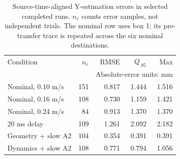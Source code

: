 \begin{table}[t]
\centering\small
\caption{Source-time-aligned Y-estimation errors in selected completed runs. $n_e$ counts error samples, not independent trials. The nominal row uses box 1; its pre-transfer trace is repeated across the six nominal destinations.}
\label{tab:errors}
\begin{tabular}{@{}p{}rrrr@{}}\toprule
Condition & $n_e$ & RMSE & $Q_{.95}$ & Max\\
& & \multicolumn{3}{c}{Absolute-error units: mm}\\\midrule
Nominal, 0.10 m/s & 151 & 0.817 & 1.444 & 1.516\\
Nominal, 0.16 m/s & 108 & 0.730 & 1.159 & 1.421\\
Nominal, 0.24 m/s & 84 & 0.913 & 1.370 & 1.370\\
20 ms delay & 109 & 1.261 & 2.092 & 2.182\\
Geometry + slow A2 & 104 & 0.354 & 0.391 & 0.391\\
Dynamics + slow A2 & 108 & 0.771 & 0.794 & 1.056\\
\bottomrule\end{tabular}
\end{table}